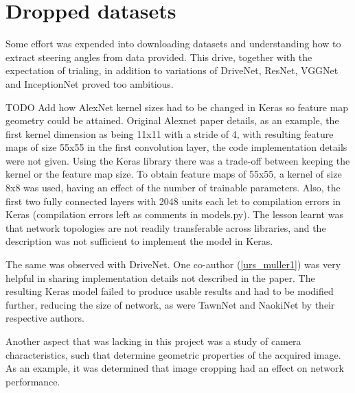 \section{Dropped datasets}
Some effort was expended into downloading datasets and understanding how to extract steering angles from data provided. This drive, together with the expectation of trialing, in addition to variations of DriveNet, ResNet, VGGNet and InceptionNet proved too ambitious.   

TODO Add how AlexNet kernel sizes had to be changed in Keras so feature map geometry could be attained. Original Alexnet paper details, as an example, the first kernel dimension as being 11x11 with a stride of 4, with resulting feature maps of size 55x55 in the first convolution layer, the code implementation details were not given. Using the Keras library there was a trade-off between keeping the kernel or the feature map size. To obtain feature maps of 55x55, a kernel of size 8x8 was used, having an effect of the number of trainable parameters. 
Also, the first two fully connected layers with 2048 units each let to compilation errors in Keras (compilation errors left as comments in models.py). The lesson learnt was that network topologies are not readily transferable across libraries, and the description was not sufficient to implement the model in Keras.  

The same was observed with DriveNet. One co-author (\ref{urs_muller1}) was very helpful in sharing implementation details not described in the paper. The resulting Keras model failed to produce usable results and had to be modified further, reducing the size of network, as were TawnNet and NaokiNet by their respective authors.


Another aspect that was lacking in this project was a study of camera characteristics, such that determine geometric properties of the acquired image. As an example, it was determined that image cropping had an effect on network performance. 


